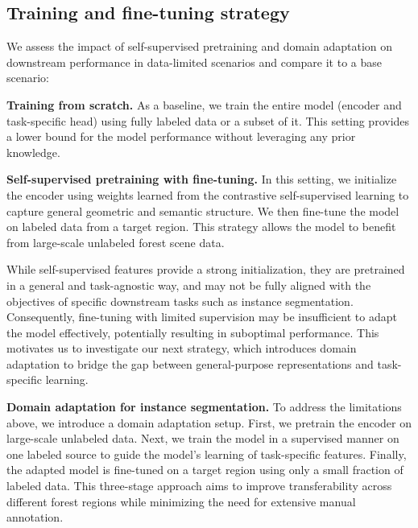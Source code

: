 \documentclass[review,authoryear]{elsarticle}
\begin{document}


\subsection{Training and fine-tuning strategy}
\label{sec:training_finetuning_strategy}
We assess the impact of self-supervised pretraining and domain adaptation on downstream performance in data-limited scenarios and compare it to a base scenario: %

\textbf{Training from scratch.} As a baseline, we train the entire model (encoder and task-specific head) using fully labeled data or a subset of it. This setting provides a lower bound for the model performance without leveraging any prior knowledge.

\textbf{Self-supervised pretraining with fine-tuning.} In this setting, we initialize the encoder using weights learned from the contrastive self-supervised learning to capture general geometric and semantic structure. We then fine-tune the model on labeled data from a target region. This strategy allows the model to benefit from large-scale unlabeled forest scene data. 

While self-supervised features provide a strong initialization, they are pretrained in a general and task-agnostic way, and may not be fully aligned with the objectives of specific downstream tasks such as instance segmentation. Consequently, fine-tuning with limited supervision may be insufficient to adapt the model effectively, potentially resulting in suboptimal performance. This motivates us to investigate our next strategy, which introduces domain adaptation to bridge the gap between general-purpose representations and task-specific learning. 

\textbf{Domain adaptation for instance segmentation.} To address the limitations above, we introduce a domain adaptation setup. First, we pretrain the encoder on large-scale unlabeled data. Next, we train the model in a supervised manner on one labeled source to guide the model's learning of task-specific features. Finally, the adapted model is fine-tuned on a target region using only a small fraction of labeled data. This three-stage approach aims to improve transferability across different forest regions while minimizing the need for extensive manual annotation.
\end{document}
